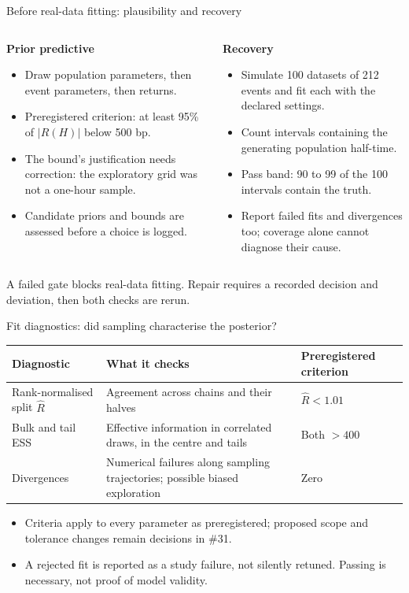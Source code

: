 \documentclass[aspectratio=169,11pt]{beamer}
\newcommand{\source}[1]{\par\vfill{\scriptsize\color{muted}#1}\par}
\newcommand{\heading}[1]{{\bfseries #1}\par\vspace{0.4em}}
\begin{document}
\begin{frame}{Before real-data fitting: plausibility and recovery}
\begin{columns}[T,onlytextwidth]
\begin{column}{0.47\textwidth}\heading{Prior predictive}
\begin{itemize}
\item Draw population parameters, then event parameters, then returns.
\item Preregistered criterion: at least 95\% of $|R(H)|$ below 500 bp.
\item The bound's justification needs correction: the exploratory grid was not a one-hour sample.
\item Candidate priors and bounds are assessed before a choice is logged.
\end{itemize}\end{column}
\begin{column}{0.47\textwidth}\heading{Recovery}
\begin{itemize}
\item Simulate 100 datasets of 212 events and fit each with the declared settings.
\item Count intervals containing the generating population half-time.
\item Pass band: 90 to 99 of the 100 intervals contain the truth.
\item Report failed fits and divergences too; coverage alone cannot diagnose their cause.
\end{itemize}\end{column}\end{columns}
\source{A failed gate blocks real-data fitting. Repair requires a recorded decision and deviation, then both checks are rerun.}
\end{frame}

\begin{frame}{Fit diagnostics: did sampling characterise the posterior?}
\small\renewcommand{\arraystretch}{1.25}
\begin{tabular}{@{}L{0.23\textwidth}L{0.47\textwidth}L{0.24\textwidth}@{}}\toprule
Diagnostic & What it checks & Preregistered criterion\\\midrule
Rank-normalised split $\widehat R$ & Agreement across chains and their halves & $\widehat R<1.01$\\
Bulk and tail ESS & Effective information in correlated draws, in the centre and tails & Both $>400$\\
Divergences & Numerical failures along sampling trajectories; possible biased exploration & Zero\\\bottomrule
\end{tabular}
\vspace{0.4cm}\begin{itemize}
\item Criteria apply to every parameter as preregistered; proposed scope and tolerance changes remain decisions in \#31.
\item A rejected fit is reported as a study failure, not silently retuned. Passing is necessary, not proof of model validity.
\end{itemize}
\end{frame}
\end{document}
